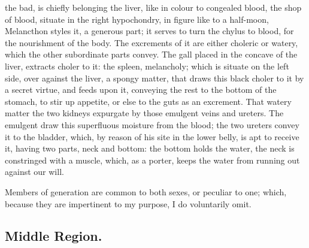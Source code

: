 the bad, is chiefly belonging the liver, like in colour to congealed blood, the
shop of blood, situate in the right hypochondry, in figure like to a half-moon,
 Melancthon styles it, a generous part; it serves to turn
the chylus to blood, for the nourishment of the body. The excrements of it are
either choleric or watery, which the other subordinate parts convey. The gall
placed in the concave of the liver, extracts choler to it: the spleen,
melancholy; which is situate on the left side, over against the liver, a spongy
matter, that draws this black choler to it by a secret virtue, and feeds upon
it, conveying the rest to the bottom of the stomach, to stir up appetite, or
else to the guts as an excrement. That watery matter the two kidneys expurgate
by those emulgent veins and ureters. The emulgent draw this superfluous
moisture from the blood; the two ureters convey it to the bladder, which, by
reason of his site in the lower belly, is apt to receive it, having two parts,
neck and bottom: the bottom holds the water, the neck is constringed with a
muscle, which, as a porter, keeps the water from running out against our will.

Members of generation are common to both sexes, or peculiar to one; which,
because they are impertinent to my purpose, I do voluntarily omit.

\subsection{Middle Region.}

